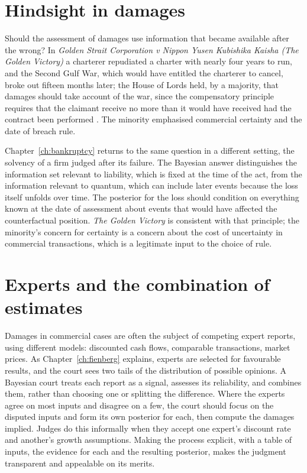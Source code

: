 \section{Hindsight in damages}

Should the assessment of damages use information that became available after the wrong? In \emph{Golden Strait Corporation v Nippon Yusen Kubishika Kaisha (The Golden Victory)} a charterer repudiated a charter with nearly four years to run, and the Second Gulf War, which would have entitled the charterer to cancel, broke out fifteen months later; the House of Lords held, by a majority, that damages should take account of the war, since the compensatory principle requires that the claimant receive no more than it would have received had the contract been performed \citep{goldenvictory2007}. The minority emphasised commercial certainty and the date of breach rule.

Chapter~\ref{ch:bankruptcy} returns to the same question in a different setting, the solvency of a firm judged after its failure. The Bayesian answer distinguishes the information set relevant to liability, which is fixed at the time of the act, from the information relevant to quantum, which can include later events because the loss itself unfolds over time. The posterior for the loss should condition on everything known at the date of assessment about events that would have affected the counterfactual position. \emph{The Golden Victory} is consistent with that principle; the minority's concern for certainty is a concern about the cost of uncertainty in commercial transactions, which is a legitimate input to the choice of rule.

\section{Experts and the combination of estimates}

Damages in commercial cases are often the subject of competing expert reports, using different models: discounted cash flows, comparable transactions, market prices. As Chapter~\ref{ch:fienberg} explains, experts are selected for favourable results, and the court sees two tails of the distribution of possible opinions. A Bayesian court treats each report as a signal, assesses its reliability, and combines them, rather than choosing one or splitting the difference. Where the experts agree on most inputs and disagree on a few, the court should focus on the disputed inputs and form its own posterior for each, then compute the damages implied. Judges do this informally when they accept one expert's discount rate and another's growth assumptions. Making the process explicit, with a table of inputs, the evidence for each and the resulting posterior, makes the judgment transparent and appealable on its merits.

